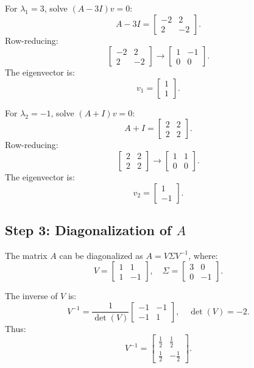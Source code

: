 \documentclass[12pt]{article}
\begin{document}
For \(\lambda_1 = 3\), solve \((A - 3I)v = 0\):
\[
A - 3I = \begin{bmatrix} -2 & 2 \\ 2 & -2 \end{bmatrix}.
\]
Row-reducing:
\[
\begin{bmatrix} -2 & 2 \\ 2 & -2 \end{bmatrix} \to \begin{bmatrix} 1 & -1 \\ 0 & 0 \end{bmatrix}.
\]
The eigenvector is:
\[
v_1 = \begin{bmatrix} 1 \\ 1 \end{bmatrix}.
\]

For \(\lambda_2 = -1\), solve \((A + I)v = 0\):
\[
A + I = \begin{bmatrix} 2 & 2 \\ 2 & 2 \end{bmatrix}.
\]
Row-reducing:
\[
\begin{bmatrix} 2 & 2 \\ 2 & 2 \end{bmatrix} \to \begin{bmatrix} 1 & 1 \\ 0 & 0 \end{bmatrix}.
\]
The eigenvector is:
\[
v_2 = \begin{bmatrix} 1 \\ -1 \end{bmatrix}.
\]

\subsection*{Step 3: Diagonalization of \(A\)}

The matrix \(A\) can be diagonalized as \(A = V \Sigma V^{-1}\), where:
\[
V = \begin{bmatrix} 1 & 1 \\ 1 & -1 \end{bmatrix}, \quad \Sigma = \begin{bmatrix} 3 & 0 \\ 0 & -1 \end{bmatrix}.
\]

The inverse of \(V\) is:
\[
V^{-1} = \frac{1}{\det(V)} \begin{bmatrix} -1 & -1 \\ -1 & 1 \end{bmatrix}, \quad \det(V) = -2.
\]
Thus:
\[
V^{-1} = \begin{bmatrix} \frac{1}{2} & \frac{1}{2} \\ \frac{1}{2} & -\frac{1}{2} \end{bmatrix}.
\]
\end{document}
